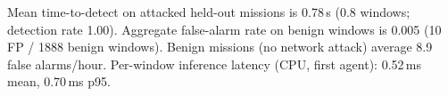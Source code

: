 Mean time-to-detect on attacked held-out missions is 0.78\,s (0.8 windows; detection rate 1.00). Aggregate false-alarm rate on benign windows is 0.005 (10 FP / 1888 benign windows). Benign missions (no network attack) average 8.9 false alarms/hour.
Per-window inference latency (CPU, first agent): 0.52\,ms mean, 0.70\,ms p95.
